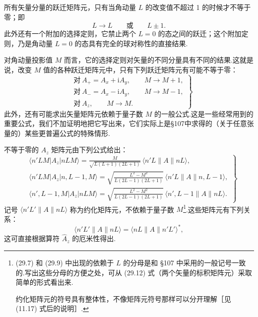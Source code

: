 所有矢量分量的跃迁矩阵元，只有当角动量 $L$ 的改变值不超过 1 的时候才不等于零；即
\begin{equation}
  L\longrightarrow L\qquad\text{或}\qquad L\pm1.
\end{equation}
此外还有一个附加的选择定则，它禁止两个 $L=0$ 的态之间的跃迁；这个附加定则，乃是角动量 $L=0$ 的态具有完全的球对称性的直接结果.

对角动量投影值 $M$ 而言，它的选择定则对矢量的不同分量具有不同的结果.这就是说，改变 $M$ 值的各种跃迁矩阵元中，只有下列跃迁矩阵元有可能不等于零：
\begin{equation}
\left.\begin{aligned}
  &\text{对}\ A_+=A_x+\mathrm{i}A_y,\qquad M\longrightarrow M+1,\\
  &\text{对}\ A_-=A_x-\mathrm{i}A_y,\qquad M\longrightarrow M-1,\\
  &\text{对}\ A_z,\qquad M\longrightarrow M.
\end{aligned}\right\}
\end{equation}
此外，还有可能求出矢量矩阵元依赖于量子数 $M$ 的一般公式.这是一些经常用到的重要公式，我们不加证明地把它写出来，它们实际上是§107中求得的（关于任意张量的）某些更普遍公式的特殊情形.

不等于零的 $A_z$ 矩阵元由下列公式给出：
\begin{equation}
\left.\begin{aligned}
  &\langle n'LM|A_z|nLM\rangle
  =\frac{M}{\sqrt{L(L+1)(2L+1)}}\,
  \langle n'L\parallel A\parallel nL\rangle,\\
  &\langle n'LM|A_z|n,L-1,M\rangle
  =\sqrt{\frac{L^2-M^2}{L(2L-1)(2L+1)}}\,
  \langle n'L\parallel A\parallel n,L-1\rangle,\\
  &\langle n',L-1,M|A_z|nLM\rangle
  =\sqrt{\frac{L^2-M^2}{L(2L-1)(2L+1)}}\,
  \langle n',L-1\parallel A\parallel nL\rangle.
\end{aligned}\right\}
\end{equation}
记号 $\langle n'L'\parallel A\parallel nL\rangle$ 称为约化矩阵元，不依赖于量子数 $M$\footnote{(29.7) 和 (29.9) 中出现的依赖于 $L$ 的分母是和 §107 中采用的一般记号一致的.写出这些分母的方便之处，可从 (29.12) 式（两个矢量的标积矩阵元）采取简单的形式看出来.

约化矩阵元的符号具有整体性，不像矩阵元符号那样可以分开理解［见 (11.17) 式后的说明］.}.这些矩阵元有下列关系：
\begin{equation}
  \langle n'L'\parallel A\parallel nL\rangle
  =\langle nL\parallel A\parallel n'L'\rangle^{*},
\end{equation}
这可直接根据算符 $\hat{A}_z$ 的厄米性得出.

